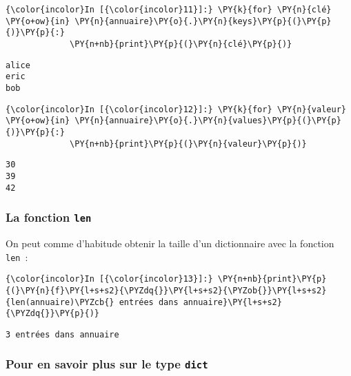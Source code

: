     \begin{Verbatim}[commandchars=\\\{\}]
{\color{incolor}In [{\color{incolor}11}]:} \PY{k}{for} \PY{n}{clé} \PY{o+ow}{in} \PY{n}{annuaire}\PY{o}{.}\PY{n}{keys}\PY{p}{(}\PY{p}{)}\PY{p}{:}
             \PY{n+nb}{print}\PY{p}{(}\PY{n}{clé}\PY{p}{)}
\end{Verbatim}


    \begin{Verbatim}[commandchars=\\\{\}]
alice
eric
bob

    \end{Verbatim}

    \begin{Verbatim}[commandchars=\\\{\}]
{\color{incolor}In [{\color{incolor}12}]:} \PY{k}{for} \PY{n}{valeur} \PY{o+ow}{in} \PY{n}{annuaire}\PY{o}{.}\PY{n}{values}\PY{p}{(}\PY{p}{)}\PY{p}{:}
             \PY{n+nb}{print}\PY{p}{(}\PY{n}{valeur}\PY{p}{)}
\end{Verbatim}


    \begin{Verbatim}[commandchars=\\\{\}]
30
39
42

    \end{Verbatim}

    \hypertarget{la-fonction-len}{%
\subsubsection{\texorpdfstring{La fonction
\texttt{len}}{La fonction len}}\label{la-fonction-len}}

    On peut comme d'habitude obtenir la taille d'un dictionnaire avec la
fonction \texttt{len}~:

    \begin{Verbatim}[commandchars=\\\{\}]
{\color{incolor}In [{\color{incolor}13}]:} \PY{n+nb}{print}\PY{p}{(}\PY{n}{f}\PY{l+s+s2}{\PYZdq{}}\PY{l+s+s2}{\PYZob{}}\PY{l+s+s2}{len(annuaire)\PYZcb{} entrées dans annuaire}\PY{l+s+s2}{\PYZdq{}}\PY{p}{)}
\end{Verbatim}


    \begin{Verbatim}[commandchars=\\\{\}]
3 entrées dans annuaire

    \end{Verbatim}

    \hypertarget{pour-en-savoir-plus-sur-le-type-dict}{%
\subsubsection{\texorpdfstring{Pour en savoir plus sur le type
\texttt{dict}}{Pour en savoir plus sur le type dict}}\label{pour-en-savoir-plus-sur-le-type-dict}}

